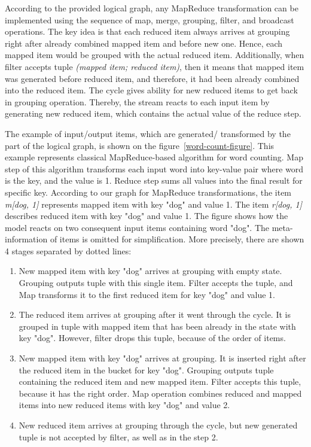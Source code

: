 According to the provided logical graph, any MapReduce transformation can be implemented using the sequence of map, merge, grouping, filter, and broadcast operations. The key idea is that each reduced item always arrives at grouping right after already combined mapped item and before new one. Hence, each mapped item would be grouped with the actual reduced item. Additionally, when filter accepts tuple {\it (mapped item; reduced item)}, then it means that mapped item was generated before reduced item, and therefore, it had been already combined into the reduced item. The cycle gives ability for new reduced items to get back in grouping operation. Thereby, the stream reacts to each input item by generating new reduced item, which contains the actual value of the reduce step. 

The example of input/output items, which are generated/ transformed by the part of the logical graph, is shown on the figure~\ref {word-count-figure}. This example represents classical MapReduce-based algorithm for word counting. Map step of this algorithm transforms each input word into key-value pair where word is the key, and the value is 1. Reduce step sums all values into the final result for specific key. According to our graph for MapReduce transformations, the item {\it m[dog, 1]} represents mapped item with key "dog" and value 1. The item {\it r[dog, 1]} describes reduced item with key "dog" and value 1. The figure shows how the model reacts on two consequent input items containing word "dog". The meta-information of items is omitted for simplification. More precisely, there are shown 4 stages separated by dotted lines:

\begin{enumerate}
    \item New mapped item with key "dog" arrives at grouping with empty state. Grouping outputs tuple with this single item. Filter accepts the tuple, and Map transforms it to the first reduced item for key "dog" and value 1.
    \item The reduced item arrives at grouping after it went through the cycle. It is grouped in tuple with mapped item that has been already in the state with key "dog". However, filter drops this tuple, because of the order of items.
    \item New mapped item with key "dog" arrives at grouping. It is inserted right after the reduced item in the bucket for key "dog". Grouping outputs tuple containing the reduced item and new mapped item. Filter accepts this tuple, because it has the right order. Map operation combines reduced and mapped items into new reduced items with key "dog" and value 2.
    \item New reduced item arrives at grouping through the cycle, but new generated tuple is not accepted by filter, as well as in the step 2.
\end{enumerate}

